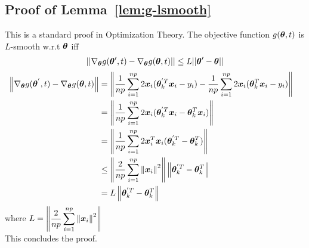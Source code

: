 \documentclass{article} %
\newcommand{\norm}[1]{\left\lVert#1\right\rVert}
\begin{document}
\begin{appendices}
	\subsection{Proof of Lemma~\ref{lem:g-lsmooth}}
	This is a standard proof in Optimization Theory. The objective function 
	$\displaystyle g({\bm{\theta}},t)$ is $L$-smooth w.r.t ${\bm{\theta}}$ iff
	\begin{equation}
		||  \nabla_{\bm{\theta}} g({\bm{\theta}}',t) - \nabla_{\bm{\theta}} g({\bm{\theta}},t) || \leq L|| {\bm{\theta}}' - {\bm{\theta}} || 
	\end{equation}
	\begin{align}
		\norm{ \nabla_{\vtheta} g(\vtheta^{'},t) - \nabla_{\vtheta} g(\vtheta,t) } &= \norm{ \frac{1}{np}\sum_{i=1}^{np}2\vx_i(\vtheta_k^{'T} \vx_i - y_i) - \frac{1}{np}\sum_{i=1}^{np}2\vx_i(\vtheta_k^T \vx_i - y_i) } &&\\
		&= \norm{\frac{1}{np}\sum_{i=1}^{np}2\vx_i(\vtheta_k^{'T}\vx_i - \vtheta_k^T\vx_i)}&&\\
		&= \norm{\frac{1}{np}\sum_{i=1}^{np}2\vx_i^T\vx_i(\vtheta_k^{'T} - \vtheta_k^T)} &&\\
		&\leq \norm{\frac{2}{np}\sum_{i=1}^{np}\norm{\vx_i}^2}\norm{\vtheta_k^{'T} - \vtheta_k^T} &&\\
		&= L\norm{\vtheta_k^{'T} - \vtheta_k^T} &&
	\end{align}
	where $\displaystyle L = \norm{\frac{2}{np}\sum_{i=1}^{np}\norm{\vx_i}^2}$\\
	This concludes the proof.
	\end{appendices}
\end{document}
